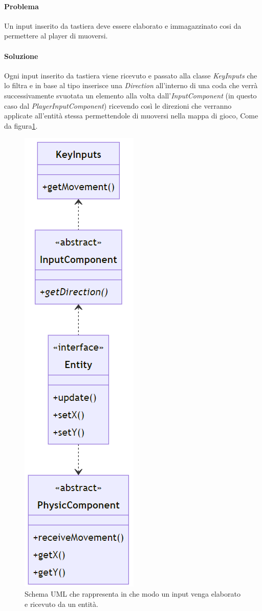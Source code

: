 \documentclass[a4paper,12pt]{report}
\begin{document}
\paragraph{Problema}
    Un input inserito da tastiera deve essere elaborato e immagazzinato cosi da permettere al player di muoversi.
\paragraph{Soluzione}
    Ogni input inserito da tastiera viene ricevuto e passato alla classe \emph{KeyInputs} che lo filtra e in base al tipo  
    inserisce una \emph{Direction} all'interno di una coda che verrà successivamente svuotata un elemento alla volta 
    dall'\emph{InputComponent} (in questo caso dal \emph{PlayerInputComponent}) ricevendo così le direzioni che verranno 
    applicate all'entità stessa permettendole di muoversi nella mappa di gioco, Come da figura\ref{img:PlayerMovement}.
\begin{figure}[H]
\centering{}
\includegraphics[scale = 0.5]{img/PlayerMovement.PNG}
\caption{Schema UML che rappresenta in che modo un input venga elaborato e ricevuto da un entità.}
\label{img:PlayerMovement}
\end{figure}
\end{document}
